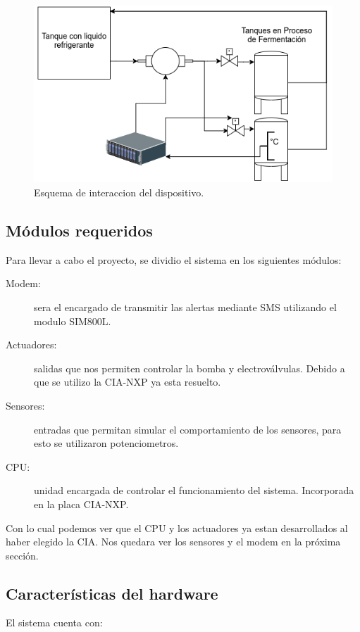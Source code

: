 \begin{figure}[htb]
  \centering
  \includegraphics[scale=0.2]{./Figures/diagrama_del_sistema.png}
  \caption{Esquema de interaccion del dispositivo.}
  \label{fig:diagrama_sistema}
\end{figure}

\subsection{ Módulos requeridos}
Para llevar a cabo el proyecto, se dividio el sistema en los siguientes módulos:
\begin{description}
  \item[Modem:] sera el encargado de transmitir las alertas mediante SMS utilizando el modulo SIM800L.
  \item[Actuadores:] salidas que nos permiten controlar la bomba y electroválvulas. Debido a que se utilizo la CIA-NXP ya esta resuelto.
  \item[Sensores:] entradas que permitan simular el comportamiento de los sensores, para esto se utilizaron potenciometros.
  \item[CPU:] unidad encargada de controlar el funcionamiento del sistema. Incorporada en la placa CIA-NXP. 
\end{description}

Con lo cual podemos ver que el CPU y los actuadores ya estan desarrollados al haber elegido la CIA. Nos quedara ver los sensores y el modem en la próxima sección.

\subsection{Características del hardware}
El sistema cuenta con:

